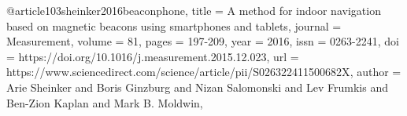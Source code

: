 @article{103sheinker2016beaconphone,
title = {A method for indoor navigation based on magnetic beacons using smartphones and tablets},
journal = {Measurement},
volume = {81},
pages = {197-209},
year = {2016},
issn = {0263-2241},
doi = {https://doi.org/10.1016/j.measurement.2015.12.023},
url = {https://www.sciencedirect.com/science/article/pii/S026322411500682X},
author = {Arie Sheinker and Boris Ginzburg and Nizan Salomonski and Lev Frumkis and Ben-Zion Kaplan and Mark B. Moldwin},
}